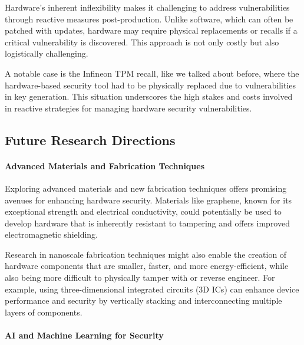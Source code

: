 Hardware's inherent inflexibility makes it challenging to address vulnerabilities through reactive measures post-production. Unlike software, which can often be patched with updates, hardware may require physical replacements or recalls if a critical vulnerability is discovered. This approach is not only costly but also logistically challenging.

A notable case is the Infineon TPM recall, like we talked about before, where the hardware-based security tool had to be physically replaced due to vulnerabilities in key generation. This situation underscores the high stakes and costs involved in reactive strategies for managing hardware security vulnerabilities.

\hypertarget{future-research-directions}{%
\subsection{Future Research
Directions}\label{future-research-directions}}

\hypertarget{advanced-materials-and-fabrication-techniques}{%
\paragraph{Advanced Materials and Fabrication
Techniques}\label{advanced-materials-and-fabrication-techniques}}

Exploring advanced materials and new fabrication techniques offers promising avenues for enhancing hardware security. Materials like graphene, known for its exceptional strength and electrical conductivity, could potentially be used to develop hardware that is inherently resistant to tampering and offers improved electromagnetic shielding.

Research in nanoscale fabrication techniques might also enable the creation of hardware components that are smaller, faster, and more energy-efficient, while also being more difficult to physically tamper with or reverse engineer. For example, using three-dimensional integrated circuits (3D ICs) can enhance device performance and security by vertically stacking and interconnecting multiple layers of components.\cite{GrapheneStrongLightweight, kavandSecuringHardwareReconfigurable2022}

\hypertarget{ai-and-machine-learning-for-security}{%
\paragraph{AI and Machine Learning for
Security}\label{ai-and-machine-learning-for-security}}

